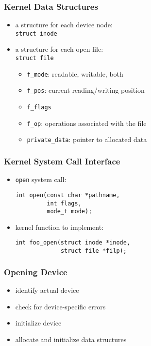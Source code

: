 \documentclass[dvipsnames]{beamer}
\begin{document}
\begin{frame}[fragile]
  \frametitle{Kernel Data Structures}

  \begin{itemize}
    \item a structure for each device node:\\
      \lstinline|struct inode|

    \pause
    \medskip
    \item a structure for each open file:\\
      \lstinline|struct file|
    \begin{itemize}
      \item \lstinline|f_mode|: readable, writable, both
      \item \lstinline|f_pos|: current reading/writing position
      \item \lstinline|f_flags|
      \item \lstinline|f_op|: operations associated with the file
      \item \lstinline|private_data|: pointer to allocated data
    \end{itemize}
  \end{itemize}
\end{frame}

\begin{frame}[fragile]
  \frametitle{Kernel System Call Interface}

  \begin{itemize}
    \item \lstinline|open| system call:
    \begin{lstlisting}
int open(const char *pathname,
         int flags,
         mode_t mode);
    \end{lstlisting}

    \medskip
    \item kernel function to implement:
    \begin{lstlisting}
int foo_open(struct inode *inode,
             struct file *filp);
    \end{lstlisting}
  \end{itemize}
\end{frame}

\begin{frame}
  \frametitle{Opening Device}

  \begin{itemize}
    \item identify actual device
    \item check for device-specific errors
    \item initialize device
    \item allocate and initialize data structures
  \end{itemize}
\end{frame}
\end{document}
